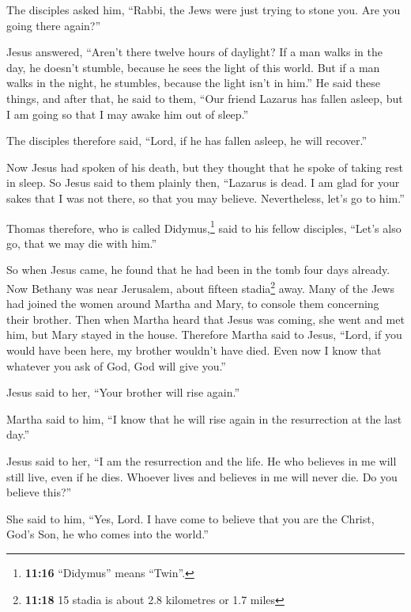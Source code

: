  The disciples asked him, ``Rabbi, the Jews were just
trying to stone you. Are you going there again?''

 Jesus answered, ``Aren't there twelve hours of daylight?
If a man walks in the day, he doesn't stumble, because he sees the light
of this world.  But if a man walks in the night, he
stumbles, because the light isn't in him.''  He said
these things, and after that, he said to them, ``Our friend Lazarus has
fallen asleep, but I am going so that I may awake him out of sleep.''

 The disciples therefore said, ``Lord, if he has fallen
asleep, he will recover.''

 Now Jesus had spoken of his death, but they thought that
he spoke of taking rest in sleep.  So Jesus said to them
plainly then, ``Lazarus is dead.  I am glad for your
sakes that I was not there, so that you may believe. Nevertheless, let's
go to him.''

 Thomas therefore, who is called Didymus,\footnote{\textbf{11:16}
  ``Didymus'' means ``Twin''.} said to his fellow disciples, ``Let's
also go, that we may die with him.''

 So when Jesus came, he found that he had been in the
tomb four days already.  Now Bethany was near Jerusalem,
about fifteen stadia\footnote{\textbf{11:18} 15 stadia is about 2.8
  kilometres or 1.7 miles} away.  Many of the Jews had
joined the women around Martha and Mary, to console them concerning
their brother.  Then when Martha heard that Jesus was
coming, she went and met him, but Mary stayed in the house.
 Therefore Martha said to Jesus, ``Lord, if you would
have been here, my brother wouldn't have died.  Even now
I know that whatever you ask of God, God will give you.''

 Jesus said to her, ``Your brother will rise again.''

 Martha said to him, ``I know that he will rise again in
the resurrection at the last day.''

 Jesus said to her, ``I am the resurrection and the life.
He who believes in me will still live, even if he dies. 
Whoever lives and believes in me will never die. Do you believe this?''

 She said to him, ``Yes, Lord. I have come to believe
that you are the Christ, God's Son, he who comes into the world.''

